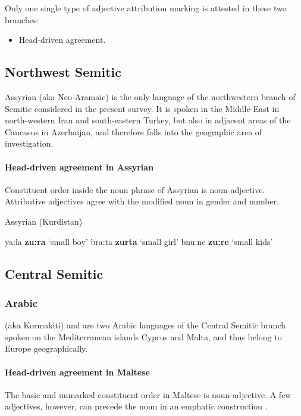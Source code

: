 Only one single type of adjective attribution marking is attested in these two branches:
\begin{itemize}
\item Head-driven agreement.
\end{itemize}

\subsection{Northwest Semitic}
Assyrian (aka Neo-Aramaic) is the only language of the northwestern branch of Semitic considered in the present survey. It is spoken in the Middle-East in north-western Iran and south-eastern Turkey, but also in adjacent areas of the Caucasus in Azerbaijan, and therefore falls into the geographic area of investigation.

\paragraph{Head-driven agreement in Assyrian}
Constituent order inside the noun phrase of Assyrian is noun-adjective. Attributive adjectives agree with the modified noun in gender and number.
\begin{exe}
\ex \rm{Assyrian (Kurdistan) \citep{krotkoff1982}}
\begin{xlist}
\ex	ya:la \textbf{zu:ra}	\rm{‘small boy’}
\ex	bra:ta \textbf{zurta}	\rm{‘small girl’}
\ex	bnu:ne \textbf{zu:re}	\rm{‘small kids’}
\end{xlist}
\end{exe}

\subsection{Central Semitic}		
\subsubsection{Arabic}
 (aka Kormakiti) and  are two Arabic languages of the Central Semitic branch spoken on the Mediterranean islands Cyprus and Malta, and thus belong to Europe geographically.

\paragraph{Head-driven agreement in Maltese}
The basic and unmarked constituent order in Maltese is noun-adjective. A few adjectives, however, can precede the noun in an emphatic construction \citep[71]{borg-etal1996}.

